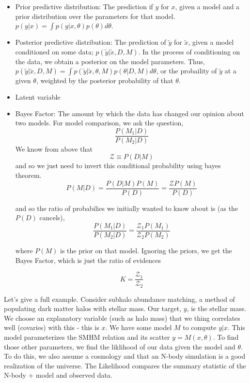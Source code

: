 \documentclass{article}
\begin{document}
\begin{itemize}
    \item Prior predictive distribution: The prediction if $y$ for $x$, given a model and a prior distribution over the parameters for that model. $p(y | x) = \int p(y | x, \theta) p(\theta) d\theta$.

    \item Posterior predictive distribution: The prediction of $\tilde{y}$ for $\tilde{x}$, given a model conditioned on some data; $p(\tilde{y} | \tilde{x}, D, M)$. In the process of conditioning on the data, we obtain a posterior on the model parameters. Thus, $p(\tilde{y} | \tilde{x}, D, M) = \int p(\tilde{y} | \tilde{x}, \theta, M) p(\theta | D, M) d\theta$, or the probaility of $\tilde{y}$ at a given $\theta$, weighted by the posterior probability of that $\theta$.

    \item Latent variable

    \item Bayes Factor: The amount by which the data has changed our opinion about two models. For model comparison, we ask the question,
        \begin{equation}
            \frac{P(M_1 | D)}{P(M_2 | D)}
        \end{equation}
        We know from above that
        \begin{equation}
            \mathcal{Z} \equiv P(D | M)
        \end{equation}
        and so we just need to invert this conditional probability using bayes theorem.
        \begin{equation}
            P(M | D) = \frac{P(D | M) P(M)}{P(D)} = \frac{\mathcal{Z} P(M)}{P(D)}
        \end{equation}

        and so the ratio of probabilies we initially wanted to know about is (as the $P(D)$ cancels),
        \begin{equation}
            \frac{P(M_1 | D)}{P(M_2 | D)} = \frac{\mathcal{Z}_1 P(M_1)}{\mathcal{Z}_2 P(M_2)}
        \end{equation}

        where $P(M)$ is the prior on that model. Ignoring the priors, we get the Bayes Factor, which is just the ratio of evidences

        \begin{equation}
            K = \frac{\mathcal{Z}_1}{\mathcal{Z}_2}
        \end{equation}
\end{itemize}

Let's give a full example. Consider subhalo abundance matching, a method of populating dark matter halos with stellar mass. Our target, $y$, is the stellar mass. We choose an explanatory variable (such as halo mass) that we thing correlates well (covaries) with this - this is $x$.
We have some model $M$ to compute $y | x$. This model parameterizes the SMHM relation and its scatter $y = M(x, \theta)$.
To find those other parameters, we find the liklihood of our data given the model and $\theta$. To do this, we also assume a cosmology and that an N-body simulation is a good realization of the universe. The Likelihood compares the summary statistic of the N-body + model and observed data.
\end{document}
